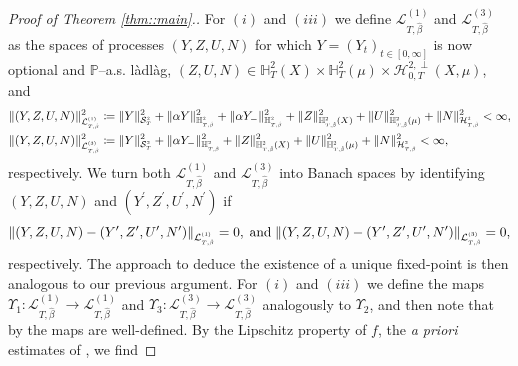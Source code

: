 \documentclass[10pt]{article} %
\newcommand\cH{\mathcal H}
\newcommand\cL{\mathcal L}
\newcommand\cS{\mathcal S}
\newcommand{\smalltext}[1]{\text{\fontsize{4}{4}\selectfont$#1$}}
\def \H{\mathbb{H}}
\def \P{\mathbb{P}}
\begin{document}
\begin{proof}[Proof of Theorem \ref{thm::main}.]
	\medskip
	For $(i)$ and $(iii)$ we define $\cL^{(1)}_{T,\hat\beta}$ and $\cL^{(3)}_{T,\hat\beta}$ as the spaces of processes $(Y,Z,U,N)$ for which $Y = (Y_t)_{t \in [0,\infty]}$ is now optional and $\P$--a.s. l\`adl\`ag, $(Z,U,N) \in \H^2_T(X) \times \H^2_T(\mu) \times \cH^{2,\perp}_{0,T}(X,\mu)$, and
	\begin{align*}
		\|(Y,Z,U,N)\|^2_{\cL^\smalltext{(1)}_{\smalltext{T}\smalltext{,}\smalltext{\hat\beta}}} &\coloneqq \|Y\|^2_{\cS^\smalltext{2}_\smalltext{T}} + \|\alpha Y\|^2_{\H^\smalltext{2}_{\smalltext{T}\smalltext{,}\smalltext{\hat\beta}}} + \|\alpha Y_-\|^2_{\H^\smalltext{2}_{\smalltext{T}\smalltext{,}\smalltext{\hat\beta}}} + \|Z\|^2_{\H^\smalltext{2}_{\smalltext{T}\smalltext{,}\smalltext{\hat\beta}}(X)} + \|U\|^2_{\H^\smalltext{2}_{\smalltext{T}\smalltext{,}\smalltext{\hat\beta}}(\mu)} + \|N\|^2_{\cH^\smalltext{2}_{\smalltext{T}\smalltext{,}\smalltext{\hat\beta}}} < \infty,\\
		\|(Y,Z,U,N)\|^2_{\cL^\smalltext{(3)}_{\smalltext{T}\smalltext{,}\smalltext{\hat\beta}}} &\coloneqq \|Y\|^2_{\cS^\smalltext{2}_\smalltext{T}} + \|\alpha Y_-\|^2_{\H^\smalltext{2}_{\smalltext{T}\smalltext{,}\smalltext{\hat\beta}}} + \|Z\|^2_{\H^\smalltext{2}_{\smalltext{T}\smalltext{,}\smalltext{\hat\beta}}(X)} + \|U\|^2_{\H^\smalltext{2}_{\smalltext{T}\smalltext{,}\smalltext{\hat\beta}}(\mu)} + \|N\|^2_{\cH^\smalltext{2}_{\smalltext{T}\smalltext{,}\smalltext{\hat\beta}}} < \infty,
	\end{align*}
	respectively. We turn both $\cL^{(1)}_{T,\hat\beta}$ and $\cL^{(3)}_{T,\hat\beta}$ into Banach spaces by identifying $(Y,Z,U,N)$ and $(Y^\prime,Z^\prime,U^\prime,N^\prime)$ if 
	\begin{equation*}
		\|(Y,Z,U,N) - (Y^\prime,Z^\prime,U^\prime,N^\prime)\|_{\cL^\smalltext{(1)}_{\smalltext{T}\smalltext{,}\smalltext{\hat\beta}}} = 0, \; \text{and} \; \|(Y,Z,U,N) - (Y^\prime,Z^\prime,U^\prime,N^\prime)\|_{\cL^\smalltext{(3)}_{\smalltext{T}\smalltext{,}\smalltext{\hat\beta}}} = 0,
	\end{equation*}
	respectively. The approach to deduce the existence of a unique fixed-point is then analogous to our previous argument. For $(i)$ and $(iii)$ we define the maps $\Upsilon_1 : \cL^{(1)}_{T,\hat\beta} \longrightarrow \cL^{(1)}_{T,\hat\beta}$ and $\Upsilon_3 : \cL^{(3)}_{T,\hat\beta} \longrightarrow \cL^{(3)}_{T,\hat\beta}$ analogously to $\Upsilon_2$, and then note that by  the maps are well-defined. By the Lipschitz property of $f$, the \emph{a priori} estimates of , we find

\end{proof}
\end{document}
